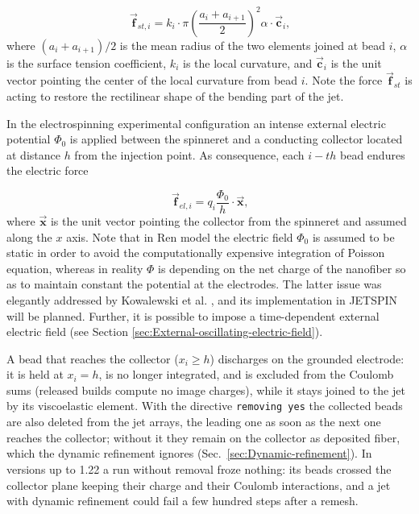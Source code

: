 \begin{equation}
\vec{\textbf{f}}_{st,i}=k_{i}\cdot\pi\left(\frac{a_{i}+a_{i+1}}{2}\right)^{2}\alpha\cdot\vec{\textbf{c}}_{i}\text{,}
\end{equation}
where $\left(a_{i}+a_{i+1}\right)/2$ is the mean radius of the two
elements joined at bead $i$, $\alpha$ is the surface tension coefficient, $k_{i}$ is the
local curvature, and $\vec{\textbf{c}}_{i}$ is the unit vector pointing
the center of the local curvature from bead $i$. Note the force $\vec{\textbf{f}}_{st}$
is acting to restore the rectilinear shape of the bending part of
the jet.

In the electrospinning experimental configuration an intense external
electric potential $\Phi_{0}$ is applied between the spinneret and
a conducting collector located at distance $h$ from the injection
point. As consequence, each $i-th$ bead endures the electric force

\begin{equation}
\vec{\textbf{f}}_{el,i}=q_{i}\frac{\Phi_{0}}{h}\cdot\vec{\textbf{x}}\text{,}
\end{equation}
where $\vec{\textbf{x}}$ is the unit vector pointing the collector
from the spinneret and assumed along the $x$ axis. Note that in Ren
model the electric field $\Phi_{0}$ is assumed to be static in order
to avoid the computationally expensive integration of Poisson equation,
whereas in reality $\Phi$ is depending on the net charge of the nanofiber
so as to maintain constant the potential at the electrodes. The latter
issue was elegantly addressed by Kowalewski et al. \cite{kowalewski2009modeling},
and its implementation in JETSPIN will be planned. Further, it is
possible to impose a time-dependent external electric field
(see Section \ref{sec:External-oscillating-electric-field}).

A bead that reaches the collector ($x_{i}\geq h$) discharges on the
grounded electrode: it is held at $x_{i}=h$, is no longer integrated, and is
excluded from the Coulomb sums (released builds compute no image charges),
while it stays joined to the jet by its viscoelastic element.  With the
directive \texttt{removing yes} the collected beads are also deleted from the
jet arrays, the leading one as soon as the next one reaches the collector;
without it they remain on the collector as deposited fiber, which the
dynamic refinement ignores (Sec.~\ref{sec:Dynamic-refinement}).  In versions
up to 1.22 a run without removal froze nothing: its beads crossed the
collector plane keeping their charge and their Coulomb interactions, and a
jet with dynamic refinement could fail a few hundred steps after a remesh.

